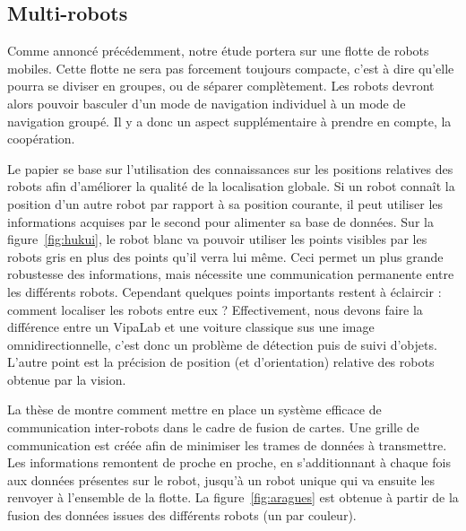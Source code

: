 \subsection{Multi-robots}

Comme annoncé précédemment, notre étude portera sur une flotte de robots mobiles.
Cette flotte ne sera pas forcement toujours compacte, c'est à dire qu'elle pourra se diviser en groupes, ou de séparer complètement.
Les robots devront alors pouvoir basculer d'un mode de navigation individuel à un mode de navigation groupé.
Il y a donc un aspect supplémentaire à prendre en compte, la coopération.

Le papier \cite{Hukui10} se base sur l'utilisation des connaissances sur les positions relatives des robots afin d'améliorer la qualité de la localisation globale.
Si un robot connaît la position d'un autre robot par rapport à sa position courante, il peut utiliser les informations acquises par le second pour alimenter sa base de données.
Sur la figure~\ref{fig:hukui}, le robot blanc va pouvoir utiliser les points visibles par les robots gris en plus des points qu'il verra lui même.
Ceci permet un plus grande robustesse des informations, mais nécessite une communication permanente entre les différents robots.
Cependant quelques points importants restent à éclaircir : comment localiser les robots entre eux ?
Effectivement, nous devons faire la différence entre un VipaLab et une voiture classique sus une image omnidirectionnelle, c'est donc un problème de détection puis de suivi d'objets.
L'autre point est la précision de position (et d'orientation) relative des robots obtenue par la vision.


La thèse de \citeauthor{Aragues11PhD} \cite{Aragues11PhD} montre comment mettre en place un système efficace de communication inter-robots dans le cadre de fusion de cartes.
Une grille de communication est créée afin de minimiser les trames de données à transmettre.
Les informations remontent de proche en proche, en s'additionnant à chaque fois aux données présentes sur le robot, jusqu'à un robot unique qui va ensuite les renvoyer à l'ensemble de la flotte.
La figure~\ref{fig:aragues} est obtenue à partir de la fusion des données issues des différents robots (un par couleur).




